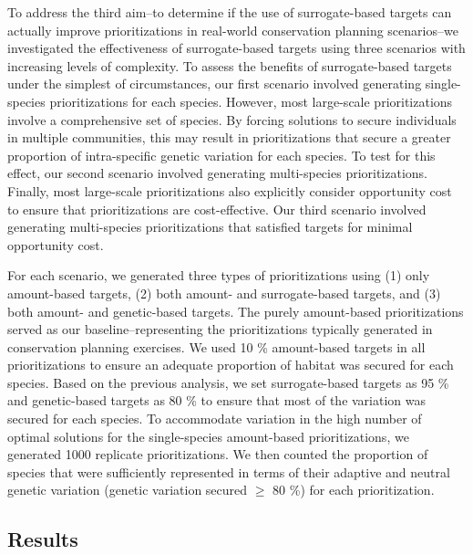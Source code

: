 \documentclass[11pt,]{article}
\begin{document}
To address the third aim--to determine if the use of surrogate-based
targets can actually improve prioritizations in real-world conservation
planning scenarios--we investigated the effectiveness of surrogate-based
targets using three scenarios with increasing levels of complexity. To
assess the benefits of surrogate-based targets under the simplest of
circumstances, our first scenario involved generating single-species
prioritizations for each species. However, most large-scale
prioritizations involve a comprehensive set of species. By forcing
solutions to secure individuals in multiple communities, this may result
in prioritizations that secure a greater proportion of intra-specific
genetic variation for each species. To test for this effect, our second
scenario involved generating multi-species prioritizations. Finally,
most large-scale prioritizations also explicitly consider opportunity
cost to ensure that prioritizations are cost-effective. Our third
scenario involved generating multi-species prioritizations that
satisfied targets for minimal opportunity cost.

For each scenario, we generated three types of prioritizations using (1)
only amount-based targets, (2) both amount- and surrogate-based targets,
and (3) both amount- and genetic-based targets. The purely amount-based
prioritizations served as our baseline--representing the prioritizations
typically generated in conservation planning exercises. We used 10 \%
amount-based targets in all prioritizations to ensure an adequate
proportion of habitat was secured for each species. Based on the
previous analysis, we set surrogate-based targets as 95 \% and
genetic-based targets as 80 \% to ensure that most of the variation was
secured for each species. To accommodate variation in the high number of
optimal solutions for the single-species amount-based prioritizations,
we generated 1000 replicate prioritizations. We then counted the
proportion of species that were sufficiently represented in terms of
their adaptive and neutral genetic variation (genetic variation secured
\(\geq\) 80 \%) for each prioritization.

\subsection{Results}\label{results}
\end{document}
